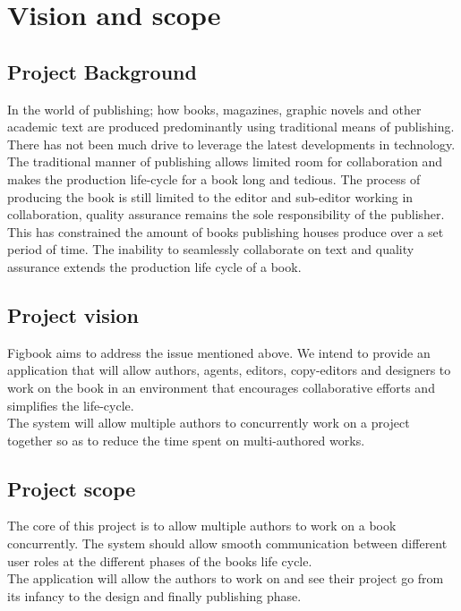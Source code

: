 \documentclass[12pt]{article}
\begin{document}


\newpage
\tableofcontents

\newpage
\listoffigures

\newpage

\section{Vision and scope}

\subsection{Project Background}
In the world of publishing; how books, magazines, graphic novels and other academic text are produced
predominantly using traditional means of publishing. There has not been much drive to leverage the
latest developments in technology.\\
The traditional manner of publishing allows limited room for collaboration and makes the production
life-cycle for a book long and tedious. The process of producing the book is still limited to the
editor and sub-editor working in collaboration, quality assurance remains the sole responsibility of the
publisher.\\
This has constrained the amount of books publishing houses produce over a set period of time. The
inability to seamlessly collaborate on text and quality assurance extends the production life cycle of a
book.
\subsection{Project vision}
Figbook aims to address the issue mentioned above. We intend to provide an application that will allow authors, agents, editors, copy-editors and designers to work on the book in an environment that encourages collaborative efforts and simplifies the life-cycle.\\
The system will allow multiple authors to concurrently work on a project together so as to reduce the time spent on multi-authored works.\\
 
\subsection{Project scope}
The core of this project is to allow multiple authors to work on a book concurrently. The system should allow smooth communication between different user roles at the different phases of the books life cycle.\\
 The application will allow the authors to work on and see their project go from its infancy to the design and finally publishing phase.
\newpage
\end{document}

